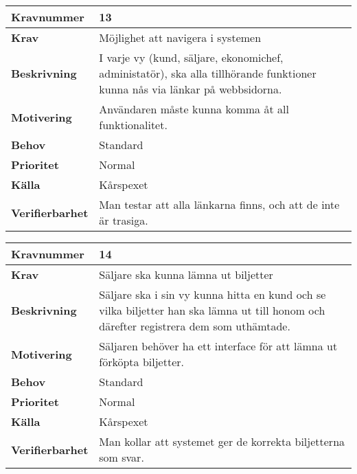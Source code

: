 \documentclass[a4paper, twoside, 11pt, titlepage]{article}
\begin{document}
\begin{tabular} { | p{3cm} | p{12.2cm} | }
	\hline
	\textbf{Kravnummer} & 13  \\
	\hline
	\textbf{Krav} & Möjlighet att navigera i systemen  \\
	\hline
	\textbf{Beskrivning} & I varje vy (kund, säljare, ekonomichef, administatör), ska alla tillhörande funktioner kunna nås via länkar på webbsidorna.  \\
	\hline
	\textbf{Motivering} & Användaren måste kunna komma åt all funktionalitet.  \\
	\hline
	\textbf{Behov} & Standard  \\
	\hline
	\textbf{Prioritet} & Normal  \\
	\hline
	\textbf{Källa} & Kårspexet  \\
	\hline
	\textbf{Verifierbarhet} & Man testar att alla länkarna finns, och att de inte är trasiga.  \\
	\hline
\end{tabular}

\begin{tabular} { | p{3cm} | p{12.2cm} | }
	\hline
	\textbf{Kravnummer} & 14  \\
	\hline
	\textbf{Krav} & Säljare ska kunna lämna ut biljetter  \\
	\hline
	\textbf{Beskrivning} & Säljare ska i sin vy kunna hitta en kund och se vilka biljetter han ska lämna ut till honom och därefter registrera dem som uthämtade.  \\
	\hline
	\textbf{Motivering} & Säljaren behöver ha ett interface för att lämna ut förköpta biljetter.  \\
	\hline
	\textbf{Behov} & Standard  \\
	\hline
	\textbf{Prioritet} & Normal  \\
	\hline
	\textbf{Källa} & Kårspexet  \\
	\hline
	\textbf{Verifierbarhet} & Man kollar att systemet ger de korrekta biljetterna som svar.   \\
	\hline
\end{tabular}
\end{document}
